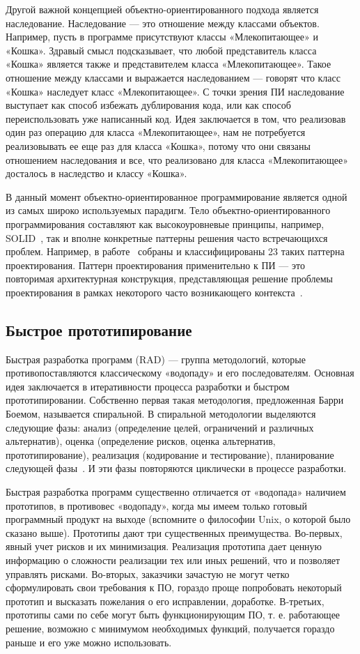 Другой важной концепцией объектно-ориентированного подхода является наследование. Наследование — это отношение между классами объектов. Например, пусть в программе присутствуют классы «Млекопитающее» и «Кошка». Здравый смысл подсказывает, что любой представитель класса «Кошка» является также и представителем класса «Млекопитающее». Такое отношение между классами и выражается наследованием — говорят что класс «Кошка» наследует класс «Млекопитающее». С точки зрения ПИ наследование выступает как способ избежать дублирования кода, или как способ переиспользовать уже написанный код. Идея заключается в том, что реализовав один раз операцию для класса «Млекопитающее», нам не потребуется реализовывать ее еще раз для класса «Кошка», потому что они связаны отношением наследования и все, что реализовано для класса «Млекопитающее» досталось в наследство и классу «Кошка».

В данный момент объектно-ориентированное программирование является одной из самых широко используемых парадигм. Тело объектно-ориентированного программирования составляют как высокоуровневые принципы, например, SOLID~\cite{SOLID}, так и вполне конкретные паттерны решения часто встречающихся проблем. Например, в работе~\cite{Gamma:1995:DPE} собраны и классифицированы 23 таких паттерна проектирования. Паттерн проектирования применительно к ПИ — это повторимая архитектурная конструкция, представляющая решение проблемы проектирования в рамках некоторого часто возникающего контекста~\cite{SDP}.

\subsection{Быстрое прототипирование}

Быстрая разработка программ (RAD) — группа методологий, которые противопоставляются классическому «водопаду» и его последователям. Основная идея заключается в итеративности процесса разработки и быстром прототипировании. Собственно первая такая методология, предложенная Барри Боемом, называется спиральной. В спиральной методологии выделяются следующие фазы: анализ (определение целей, ограничений и различных альтернатив), оценка (определение рисков, оценка альтернатив, прототипирование), реализация (кодирование и тестирование), планирование следующей фазы~\cite{Boehm:1988:SMSD}. И эти фазы повторяются циклически в процессе разработки.

Быстрая разработка программ существенно отличается от «водопада» наличием прототипов, в противовес «водопаду», когда мы имеем только готовый программный продукт на выходе (вспомните о философии Unix, о которой было сказано выше). Прототипы дают три существенных преимущества. Во-первых, явный учет рисков и их минимизация. Реализация прототипа дает ценную информацию о сложности реализации тех или иных решений, что и позволяет управлять рисками. Во-вторых, заказчики зачастую не могут четко сформулировать свои требования к ПО, гораздо проще попробовать некоторый прототип и высказать пожелания о его исправлении, доработке. В-третьих, прототипы сами по себе могут быть функционирующим ПО, т. е. работающее решение, возможно с минимумом необходимых функций, получается гораздо раньше и его уже можно использовать.

